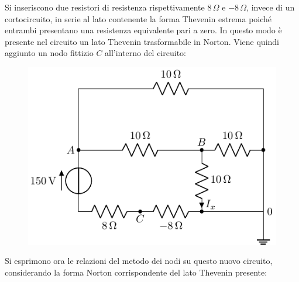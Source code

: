 \documentclass{article}
\numberwithin{equation}{subsection}
\begin{document}
Si inseriscono due resistori di resistenza rispettivamente $8\,\Omega$ e $-8\,\Omega$, invece di un cortocircuito, in serie al lato contenente la forma Thevenin estrema 
poiché entrambi presentano una resistenza equivalente pari a zero. In questo modo è presente nel circuito un lato Thevenin trasformabile in Norton. Viene quindi aggiunto un 
nodo fittizio $C$ all'interno del circuito:
\begin{figure}[H]%
    \centering
    \includegraphics{circuito-3-nodo-fittizio.pdf}%
    \label{fig:circuito-3-nodo-fittizio}
\end{figure}
Si esprimono ora le relazioni del metodo dei nodi su questo nuovo circuito, considerando la forma Norton corrispondente del lato Thevenin presente: 
\end{document}
